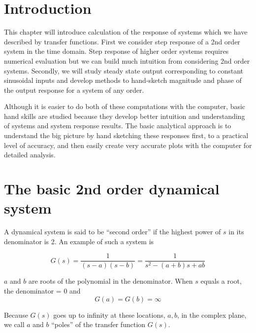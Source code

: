 \section{Introduction}
This chapter will introduce calculation of the response of systems which we have described
by transfer functions.   First we consider step response of a 2nd order system in the time
domain.   Step response of higher order systems requires numerical evaluation but we can
build much intuition from considering 2nd order systems.   Secondly,  we will study steady
state output corresponding to constant sinusoidal inputs and develop methods to
hand-sketch magnitude and phase of the output response for a system of any order.

Although it is easier to do both of these computations with the computer, basic hand skills
are studied because they develop better intuition and understanding of systems and system response
results.  The basic analytical approach is to understand the big picture by hand sketching
these responses first, to a practical level of accuracy, and then easily
create very accurate plots with the computer for detailed analysis.

\section{The basic 2nd order dynamical system}

A dynamical system is said to be ``second order'' if the highest power of $s$ in its denominator  is 2.  An example of such a system is

\[
G(s) = \frac1{(s-a)(s-b)} = \frac {1}{s^2 -(a+b)s+ab}
\]


$a$ and $b$ are roots of the polynomial in the denominator.  When $s$ equals a root, the denominator = 0 and
\[
G(a) = G(b) = \infty
\]

Because $G(s)$ goes up to infinity at these locations, $a,b$,  in the complex plane, we call $a$ and $b$ ``poles'' of the transfer function
$G(s)$.

\newpage

